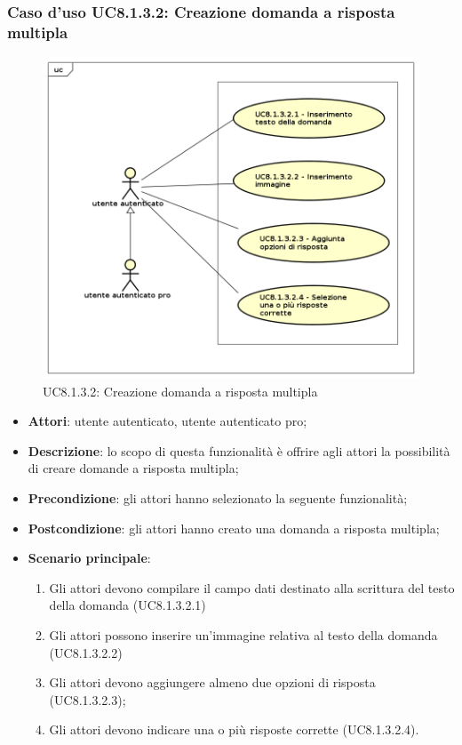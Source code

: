\subsubsection{Caso d'uso UC8.1.3.2: Creazione domanda a risposta multipla}
	\label{UC8.1.3.2}
	\begin{figure}[h]
		\centering
			\includegraphics[scale=0.45,keepaspectratio]{UML/UC8_1_3_2.png}
		\caption{UC8.1.3.2: Creazione domanda a risposta multipla}
	\end{figure}
	\FloatBarrier
	\begin{itemize}
		\item
			\textbf{Attori}: utente autenticato, utente autenticato pro;
		\item		
			\textbf{Descrizione}: lo scopo di questa funzionalità è offrire agli attori la possibilità di creare domande a risposta multipla;
		\item
			\textbf{Precondizione}: gli attori hanno selezionato la seguente funzionalità; 
		\item
			\textbf{Postcondizione}: gli attori hanno creato una domanda a risposta multipla;
		\item
			\textbf{Scenario principale}:
	       		\begin{enumerate}
	       			\item
	       			Gli attori devono compilare il campo dati destinato alla scrittura del testo della domanda (UC8.1.3.2.1)
	       			\item
	       			Gli attori possono inserire un'immagine relativa al testo della domanda (UC8.1.3.2.2)
	       			\item
	       			Gli attori devono aggiungere almeno due opzioni di risposta (UC8.1.3.2.3);
					\item
					Gli attori devono indicare una o più risposte corrette (UC8.1.3.2.4).
	 			\end{enumerate}
	\end{itemize}

